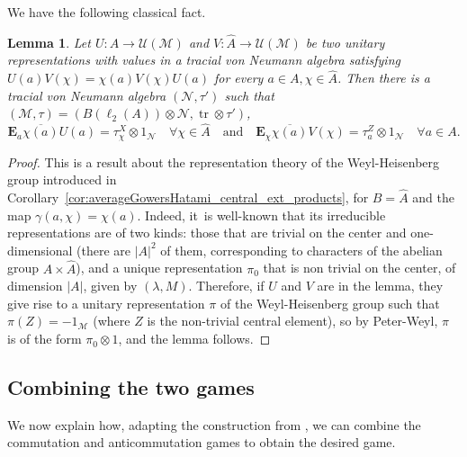 \documentclass[JEP,XML,SOM,Unicode,published]{cedram}
\theoremstyle{plain}
\newtheorem{lemma}[theorem]{Lemma}
\theoremstyle{definition}
\newcommand{\cM}{\mathcal{M}}
\newcommand{\cN}{\mathcal{N}}
\newcommand{\E}{\mathbf{E}}
\newcommand{\cU}{\mathcal{U}}
\DeclareMathOperator{\tr}{tr}
\begin{document}
\pagebreak[2]
We have the following classical fact.
\begin{lemma}\label{lem:Pauli_matrices} Let $U:A\to \cU(\cM)$ and $V:\hat A\to\cU(\cM)$ be two unitary representations with values in a tracial von Neumann algebra satisfying $U(a) V(\chi) = \chi(a) V(\chi) U(a)$ for every $a\in A,\chi \in\hat A$. Then there is a tracial von Neumann algebra $(\cN,\tau')$ such that $(\cM ,\tau) = (B(\ell_2(A))\otimes \cN,\tr\otimes \tau')$,\vspace*{-3pt}
\[
\E_a \overline{\chi(a)}U(a) =\tau^X_\chi \otimes 1_\cN \quad\forall\chi \in\hat A\quad
\text{and}\quad
\E_\chi \overline{\chi(a)} V(\chi) = \tau^Z_a\otimes 1_\cN \quad\forall a \in A.
\]
\end{lemma}
\begin{proof} This is a result about the representation theory of the Weyl-Heisenberg group introduced in Corollary~\ref{cor:averageGowersHatami_central_ext_products}, for $B=\widehat A$ and the map $\gamma(a,\chi)=\chi(a)$. Indeed, it~is well-known that its irreducible representations are of two kinds: those that are trivial on the center and one-dimensional (there are $|A|^2$ of them, corresponding to characters of the abelian group $A\times \hat A$), and a unique representation $\pi_0$ that is non trivial on the center, of dimension $|A|$, given by $(\lambda,M)$. Therefore, if $U$ and $V$ are in the lemma, they give rise to a unitary representation $\pi$ of the Weyl-Heisenberg group such that $\pi(Z)=-1_\cM$ (where $Z$ is the non-trivial central element), so by Peter-Weyl, $\pi$ is of the form $\pi_0\otimes 1$, and the lemma follows.
\end{proof}

\subsection{Combining the two games}
We now explain how, adapting the construction from \cite{MR3678246}, we can combine the commutation and anticommutation games to obtain the desired game.
\end{document}
